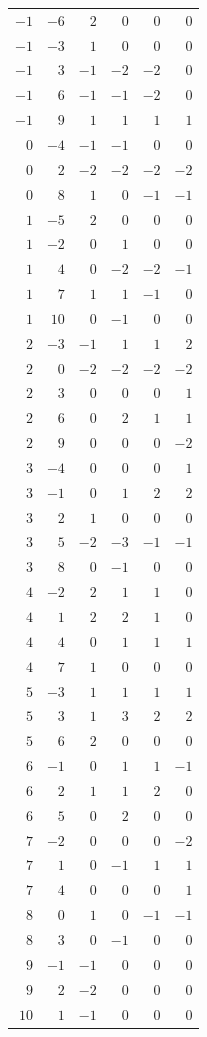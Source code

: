 \begin{longtable}{rrrrrr}
$-1$ & $-6$ & $2$ & $0$ & $0$ & $0$ \\
$-1$ & $-3$ & $1$ & $0$ & $0$ & $0$ \\
$-1$ & $3$ & $-1$ & $-2$ & $-2$ & $0$ \\
$-1$ & $6$ & $-1$ & $-1$ & $-2$ & $0$ \\
$-1$ & $9$ & $1$ & $1$ & $1$ & $1$ \\
$0$ & $-4$ & $-1$ & $-1$ & $0$ & $0$ \\
$0$ & $2$ & $-2$ & $-2$ & $-2$ & $-2$ \\
$0$ & $8$ & $1$ & $0$ & $-1$ & $-1$ \\
$1$ & $-5$ & $2$ & $0$ & $0$ & $0$ \\
$1$ & $-2$ & $0$ & $1$ & $0$ & $0$ \\
$1$ & $4$ & $0$ & $-2$ & $-2$ & $-1$ \\
$1$ & $7$ & $1$ & $1$ & $-1$ & $0$ \\
$1$ & $10$ & $0$ & $-1$ & $0$ & $0$ \\
$2$ & $-3$ & $-1$ & $1$ & $1$ & $2$ \\
$2$ & $0$ & $-2$ & $-2$ & $-2$ & $-2$ \\
$2$ & $3$ & $0$ & $0$ & $0$ & $1$ \\
$2$ & $6$ & $0$ & $2$ & $1$ & $1$ \\
$2$ & $9$ & $0$ & $0$ & $0$ & $-2$ \\
$3$ & $-4$ & $0$ & $0$ & $0$ & $1$ \\
$3$ & $-1$ & $0$ & $1$ & $2$ & $2$ \\
$3$ & $2$ & $1$ & $0$ & $0$ & $0$ \\
$3$ & $5$ & $-2$ & $-3$ & $-1$ & $-1$ \\
$3$ & $8$ & $0$ & $-1$ & $0$ & $0$ \\
$4$ & $-2$ & $2$ & $1$ & $1$ & $0$ \\
$4$ & $1$ & $2$ & $2$ & $1$ & $0$ \\
$4$ & $4$ & $0$ & $1$ & $1$ & $1$ \\
$4$ & $7$ & $1$ & $0$ & $0$ & $0$ \\
$5$ & $-3$ & $1$ & $1$ & $1$ & $1$ \\
$5$ & $3$ & $1$ & $3$ & $2$ & $2$ \\
$5$ & $6$ & $2$ & $0$ & $0$ & $0$ \\
$6$ & $-1$ & $0$ & $1$ & $1$ & $-1$ \\
$6$ & $2$ & $1$ & $1$ & $2$ & $0$ \\
$6$ & $5$ & $0$ & $2$ & $0$ & $0$ \\
$7$ & $-2$ & $0$ & $0$ & $0$ & $-2$ \\
$7$ & $1$ & $0$ & $-1$ & $1$ & $1$ \\
$7$ & $4$ & $0$ & $0$ & $0$ & $1$ \\
$8$ & $0$ & $1$ & $0$ & $-1$ & $-1$ \\
$8$ & $3$ & $0$ & $-1$ & $0$ & $0$ \\
$9$ & $-1$ & $-1$ & $0$ & $0$ & $0$ \\
$9$ & $2$ & $-2$ & $0$ & $0$ & $0$ \\
$10$ & $1$ & $-1$ & $0$ & $0$ & $0$ \\
\end{longtable}

